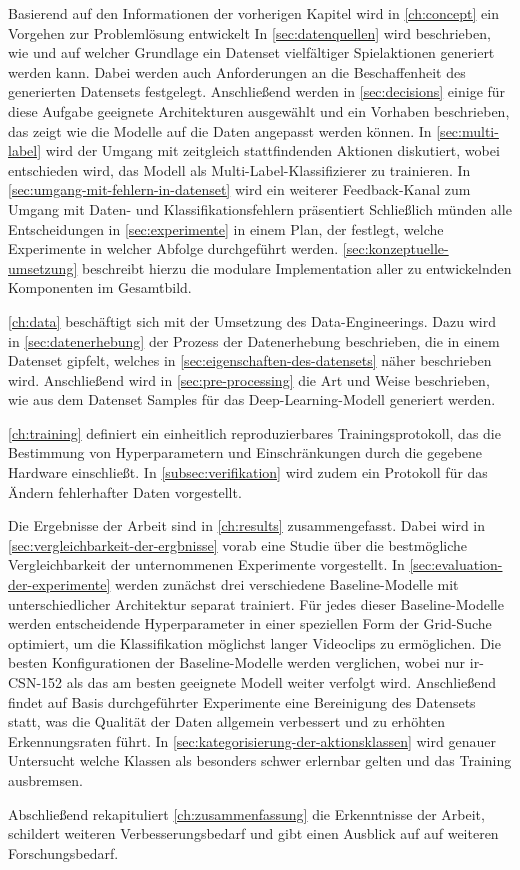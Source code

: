 Basierend auf den Informationen der vorherigen Kapitel wird in \autoref{ch:concept} ein Vorgehen zur Problemlösung entwickelt
In \autoref{sec:datenquellen} wird beschrieben, wie und auf welcher Grundlage ein Datenset vielfältiger Spielaktionen generiert werden kann.
Dabei werden auch Anforderungen an die Beschaffenheit des generierten Datensets festgelegt.
Anschließend werden in \autoref{sec:decisions} einige für diese Aufgabe geeignete Architekturen ausgewählt und ein Vorhaben beschrieben, das zeigt wie die Modelle auf die Daten angepasst werden können.
In \autoref{sec:multi-label} wird der Umgang mit zeitgleich stattfindenden Aktionen diskutiert, wobei entschieden wird, das Modell als Multi-Label-Klassifizierer zu trainieren.
In \autoref{sec:umgang-mit-fehlern-in-datenset} wird ein weiterer Feedback-Kanal zum Umgang mit Daten- und Klassifikationsfehlern präsentiert
Schließlich münden alle Entscheidungen in \autoref{sec:experimente} in einem Plan, der festlegt, welche Experimente in welcher Abfolge durchgeführt werden.
\autoref{sec:konzeptuelle-umsetzung} beschreibt hierzu die modulare Implementation aller zu entwickelnden Komponenten im Gesamtbild.

\autoref{ch:data} beschäftigt sich mit der Umsetzung des Data-Engineerings.
Dazu wird in \autoref{sec:datenerhebung} der Prozess der Datenerhebung beschrieben, die in einem Datenset gipfelt, welches in \autoref{sec:eigenschaften-des-datensets} näher beschrieben wird.
Anschließend wird in \autoref{sec:pre-processing} die Art und Weise beschrieben, wie aus dem Datenset Samples für das Deep-Learning-Modell generiert werden.

\autoref{ch:training} definiert ein einheitlich reproduzierbares Trainingsprotokoll, das die Bestimmung von Hyperparametern und Einschränkungen durch die gegebene Hardware einschließt.
In \autoref{subsec:verifikation} wird zudem ein Protokoll für das Ändern fehlerhafter Daten vorgestellt.

Die Ergebnisse der Arbeit sind in \autoref{ch:results} zusammengefasst.
Dabei wird in \autoref{sec:vergleichbarkeit-der-ergbnisse} vorab eine Studie über die bestmögliche Vergleichbarkeit der unternommenen Experimente vorgestellt.
In \autoref{sec:evaluation-der-experimente} werden zunächst drei verschiedene Baseline-Modelle mit unterschiedlicher Architektur separat trainiert.
Für jedes dieser Baseline-Modelle werden entscheidende Hyperparameter in einer speziellen Form der Grid-Suche optimiert, um die Klassifikation möglichst langer Videoclips zu ermöglichen.
Die besten Konfigurationen der Baseline-Modelle werden verglichen, wobei nur ir-CSN-152 als das am besten geeignete Modell weiter verfolgt wird.
Anschließend findet auf Basis durchgeführter Experimente eine Bereinigung des Datensets statt, was die Qualität der Daten allgemein verbessert und zu erhöhten Erkennungsraten führt.
In \autoref{sec:kategorisierung-der-aktionsklassen} wird genauer Untersucht welche Klassen als besonders schwer erlernbar gelten und das Training ausbremsen.

Abschließend rekapituliert \autoref{ch:zusammenfassung} die Erkenntnisse der Arbeit, schildert weiteren Verbesserungsbedarf und gibt einen Ausblick auf auf weiteren Forschungsbedarf.

